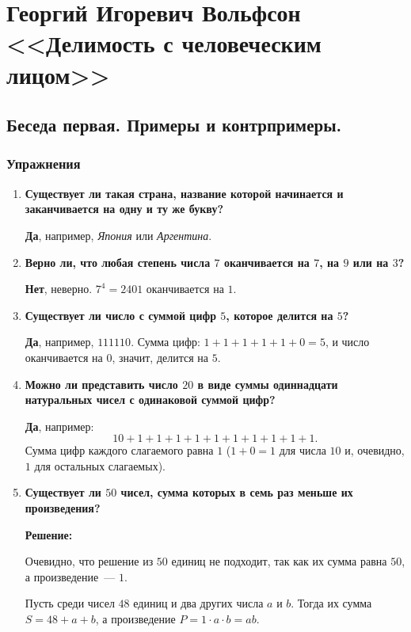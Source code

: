 \documentclass[12pt, a4paper]{article}
\begin{document}
\section*{Георгий Игоревич Вольфсон <<Делимость с человеческим лицом>>}

\subsection*{Беседа первая. Примеры и контрпримеры.}

\subsubsection*{Упражнения}

\begin{enumerate}[label=\arabic*., wide=0pt, leftmargin=*]
    \item \textbf{Существует ли такая страна, название которой начинается и заканчивается на одну и ту же букву?}

    \textbf{Да}, например, \emph{Япония} или \emph{Аргентина}.

    \item \textbf{Верно ли, что любая степень числа $7$ оканчивается на $7$, на $9$ или на $3$?}

    \textbf{Нет}, неверно. $7^4 = 2401$ оканчивается на $1$.

    \item \textbf{Существует ли число с суммой цифр $5$, которое делится на $5$?}

    \textbf{Да}, например, $111110$. Сумма цифр: $1+1+1+1+1+0=5$, и число оканчивается на $0$, значит, делится на $5$.

    \item \textbf{Можно ли представить число $20$ в виде суммы одиннадцати натуральных чисел с одинаковой суммой цифр?}

    \textbf{Да}, например:
    \[
    10 + 1 + 1 + 1 + 1 + 1 + 1 + 1 + 1 + 1 + 1.
    \]
    Сумма цифр каждого слагаемого равна $1$ ($1+0=1$ для числа $10$ и, очевидно, $1$ для остальных слагаемых).

    \item \textbf{Существует ли $50$ чисел, сумма которых в семь раз меньше их произведения?}

    \textbf{Решение:}

    Очевидно, что решение из $50$ единиц не подходит, так как их сумма равна $50$, а произведение~--- $1$.

    Пусть среди чисел $48$ единиц и два других числа $a$ и $b$. Тогда их сумма $S = 48 + a + b$, а произведение $P = 1 \cdot a \cdot b = ab$.


\end{enumerate}
\end{document}
